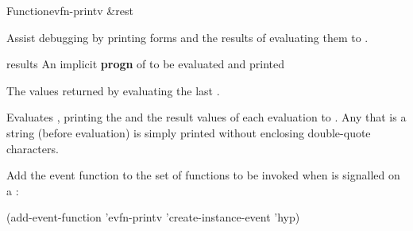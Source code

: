 \documentclass[10pt,twoside,english,pdftex]{article}
\begin{document}

\begin{functiondoc}{Function}{evfn-printv}{ 
    \&rest }
% 

\fnsyntax

\fnpurpose Assist debugging by printing forms and the results of
evaluating them to .

\fnpackage {}

\fnmodule {}

\fnargs
\begin{args}{results}
\arg[forms] An implicit \textbf{progn} of  to be
evaluated and printed  
\end{args}

\fnreturns The values returned by evaluating the last .

\fndescription Evaluates , printing the  and the
result values of each evaluation to .  Any
that is a string (before evaluation) is simply printed without enclosing
double-quote characters.

\fnexamples
{}%
Add the event function  to the set of functions
to be invoked when  is signalled on a
 :
\begin{example}
  (add-event-function 'evfn-printv 'create-instance-event 'hyp)
\end{example}


\end{functiondoc}

\end{document}

